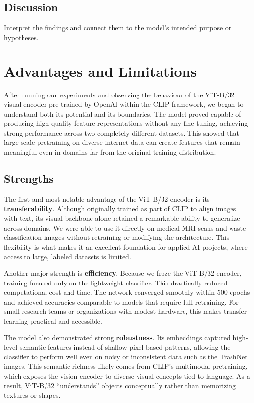 \documentclass[12pt]{article}
\begin{document}
\subsection{Discussion}
Interpret the findings and connect them to the model’s intended purpose or hypotheses.



\section{Advantages and Limitations}

After running our experiments and observing the behaviour of the ViT-B/32 visual encoder pre-trained by OpenAI within the CLIP framework, we began to understand both its potential and its boundaries. The model proved capable of producing high-quality feature representations without any fine-tuning, achieving strong performance across two completely different datasets. This showed that large-scale pretraining on diverse internet data can create features that remain meaningful even in domains far from the original training distribution.

\subsection{Strengths}
The first and most notable advantage of the ViT-B/32 encoder is its \textbf{transferability}. Although originally trained as part of CLIP to align images with text, its visual backbone alone retained a remarkable ability to generalize across domains. We were able to use it directly on medical MRI scans and waste classification images without retraining or modifying the architecture. This flexibility is what makes it an excellent foundation for applied AI projects, where access to large, labeled datasets is limited.

Another major strength is \textbf{efficiency}. Because we froze the ViT-B/32 encoder, training focused only on the lightweight classifier. This drastically reduced computational cost and time. The network converged smoothly within 500 epochs and achieved accuracies comparable to models that require full retraining. For small research teams or organizations with modest hardware, this makes transfer learning practical and accessible.

The model also demonstrated strong \textbf{robustness}. Its embeddings captured high-level semantic features instead of shallow pixel-based patterns, allowing the classifier to perform well even on noisy or inconsistent data such as the TrashNet images. This semantic richness likely comes from CLIP’s multimodal pretraining, which exposes the vision encoder to diverse visual concepts tied to language. As a result, ViT-B/32 “understands” objects conceptually rather than memorizing textures or shapes.
\end{document}
